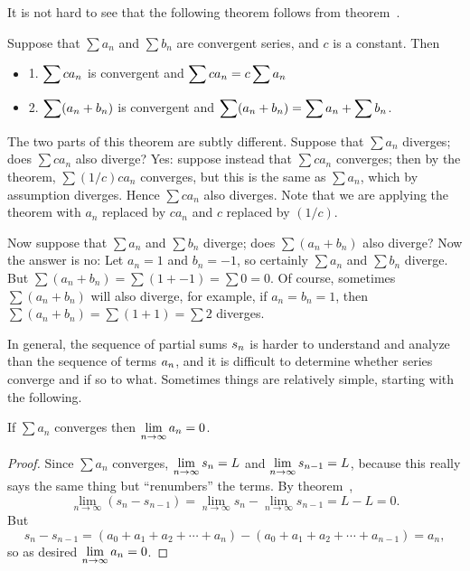 It is not hard to see that the following theorem follows from
theorem~. 

\begin{theorem} \relax\label{thm:series are linear}
Suppose that $\sum a_n$ and $\sum b_n$ are convergent series,
and $c$ is a constant. Then

\begin{itemize} %
\item{1.} $\displaystyle\sum ca_n$ is convergent and $\displaystyle\sum ca_n=c\sum a_n$
\item{2.} $\displaystyle\sum (a_n+b_n)$ is convergent and 
$\displaystyle\sum (a_n+b_n)=\sum a_n+\sum b_n$.
\end{itemize}
\end{theorem}

The two parts of this theorem are subtly different. Suppose that
$\sum a_n$ diverges; does $\sum ca_n$ also diverge? Yes: suppose
instead that $\sum ca_n$ converges; then by the theorem,
$\sum (1/c)ca_n$ converges, but this is the same as $\sum a_n$,
which by assumption diverges. Hence $\sum ca_n$ also diverges. Note
that we are applying the theorem with $a_n$ replaced by $ca_n$ and $c$
replaced by $(1/c)$.

Now suppose that $\sum a_n$ and $\sum b_n$ diverge; does
$\sum (a_n+b_n)$ also diverge? Now the answer is no: Let $a_n=1$ and
$b_n=-1$, so certainly $\sum a_n$ and $\sum b_n$ diverge. But
$\sum (a_n+b_n)=\sum(1+-1)=\sum 0 = 0$. Of course, sometimes 
$\sum (a_n+b_n)$ will also diverge, for example, if $a_n=b_n=1$, then
$\sum (a_n+b_n)=\sum(1+1)=\sum 2$ diverges.

In general, the sequence of partial sums $\displaystyle s_n$ is harder to understand
and analyze than the sequence of terms $\displaystyle a_n$, and it is difficult
to determine whether series converge and if so to what. Sometimes
things are relatively simple, starting with the following.

\begin{theorem} If $\sum a_n$ converges then $\displaystyle\lim_{n\to\infty}a_n=0$.
\end{theorem}
\begin{proof} Since $\sum a_n$ converges, $\displaystyle\lim_{n\to\infty}s_n=L$ and 
$\displaystyle\lim_{n\to\infty}s_{n-1}=L$, because this really says the same
thing but ``renumbers'' the terms. By
theorem~, 
$$
  \lim_{n\to\infty} (s_{n}-s_{n-1})=
  \lim_{n\to\infty} s_{n}-\lim_{n\to\infty}s_{n-1}=L-L=0.
$$
But
$$
  s_{n}-s_{n-1}=(a_0+a_1+a_2+\cdots+a_n)-(a_0+a_1+a_2+\cdots+a_{n-1})
  =a_n,
$$
so as desired $\displaystyle\lim_{n\to\infty}a_n=0$.
\end{proof}
\label{thm:divergence test}

